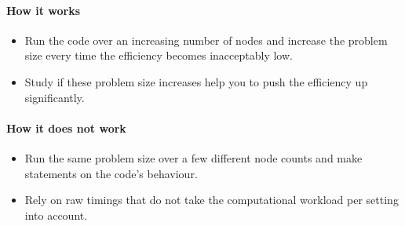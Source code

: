 \paragraph*{How it works}

\begin{itemize}[noitemsep]
  \item[$\boxplus$] Run the code over an increasing number of nodes and increase the problem size every time the efficiency becomes inacceptably low.
  \item[$\boxplus$] Study if these problem size increases help you to push the efficiency up significantly.
\end{itemize}


\paragraph*{How it does not work}

\begin{itemize}[noitemsep]
  \item[$\boxminus$] Run the same problem size over a few  different node counts and make statements on the code's behaviour. 
  \item[$\boxminus$] Rely on raw timings that do not take the computational workload per setting into account. 
\end{itemize}
